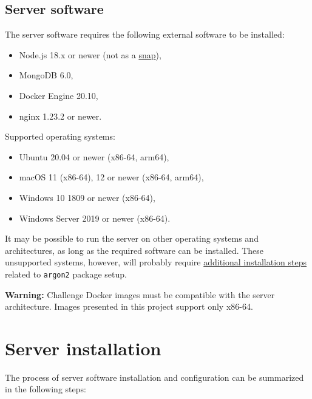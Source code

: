 \subsection{Server software}
\label{chap:server-soft}

The server software requires the following external software to be installed:

\begin{itemize}
    \item Node.js 18.x or newer (not as a \href{https://snapcraft.io/node}{snap}),
    \item MongoDB 6.0,
    \item Docker Engine 20.10,
    \item nginx 1.23.2 or newer.
\end{itemize}

Supported operating systems:

\begin{itemize}
    \item Ubuntu 20.04 or newer (x86-64, arm64),
    \item macOS 11 (x86-64), 12 or newer (x86-64, arm64),
    \item Windows 10 1809 or newer (x86-64),
    \item Windows Server 2019 or newer (x86-64).
\end{itemize}

It may be possible to run the server on other operating systems and architectures, as long as the required software can be installed. These unsupported systems, however, will probably require \href{https://github.com/ranisalt/node-argon2/tree/v0.30.3#before-installing}{additional installation steps} related to \texttt{argon2} package setup.

\textbf{Warning:} Challenge Docker images must be compatible with the server architecture. Images presented in this project support only x86-64.

\section{Server installation}

The process of server software installation and configuration can be summarized in the following steps:

